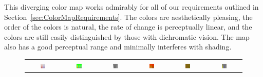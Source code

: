 \documentclass{llncs}
\begin{document}
This diverging color map works admirably for all of our
requirements outlined in
Section~\ref{sec:ColorMapRequirements}.  The colors are aesthetically
pleasing, the order of the colors is natural, the rate of change is
perceptually linear, and the colors are still easily distinguished by those
with dichromatic vision.  The map also has a good perceptual range and
minimally interferes with shading.

\begin{figure}
  \centering
  \begin{tabular}{c@{\,}c@{\,}c@{\,}c@{\,}c@{\,}c}
    \includegraphics[width=0.16\textwidth]{images/Cool2WarmSpatialContrast} &
    \includegraphics[width=0.16\textwidth]{images/RainbowSpatialContrast} &
    \includegraphics[width=0.16\textwidth]{images/GrayscaleSpatialContrast} &
    \includegraphics[width=0.16\textwidth]{images/BlackBodySpatialContrast} &
    \includegraphics[width=0.16\textwidth]{images/Green2RedSpatialContrast} &
    \includegraphics[width=0.16\textwidth]{images/Blue2YellowSpatialContrast} \\


\end{tabular}
\end{figure}
\end{document}
